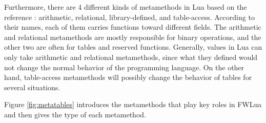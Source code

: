 Furthermore, there are 4 different kinds of metamethods in Lua based on the reference \cite{PIL}: arithmetic, relational, library-defined, and table-access. According to their names, each of them carries functions toward different fields. The arithmetic and relational metamethods are mostly responsible for binary operations, and the other two are often for tables and reserved functions. Generally, values in Lua can only take arithmetic and relational metamethods, since what they defined would not change the normal behavior of the programming language. On the other hand, table-access metamethods will possibly change the behavior of tables for several situations.

Figure \ref{fig:metatables} introduces the metamethods that play key roles in FWLua and then gives the type of each metamethod.


